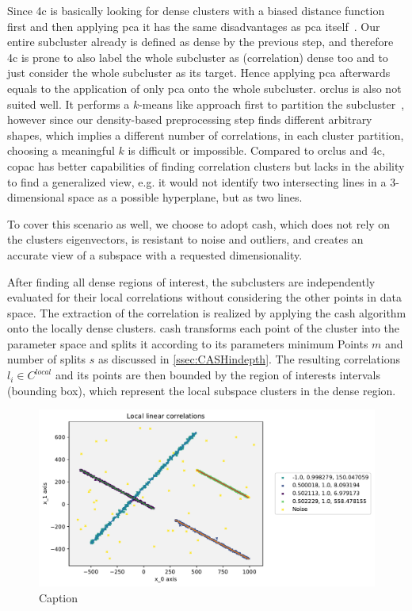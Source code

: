 Since \gls{4c} is basically looking for dense clusters with a biased distance function first and then applying \gls{pca} it has the same disadvantages as \gls{pca} itself~\cite{4cbohm2004computing}. Our entire subcluster already is defined as dense by the previous step, and therefore \gls{4c} is prone to also label the whole subcluster as (correlation) dense too and to just consider the whole subcluster as its target. Hence applying \gls{pca} afterwards equals to the application of only \gls{pca} onto the whole subcluster. 
\gls{orclus} is also not suited well. It performs a $k$-means like approach first to partition the subcluster~\cite{orclusaggarwal2000finding}, however since our density-based preprocessing step finds different arbitrary shapes, which implies a different number of correlations, in each cluster partition, choosing a meaningful $k$ is difficult or impossible. 
Compared to \gls{orclus} and \gls{4c}, \gls{copac} has better capabilities of finding correlation clusters but lacks in the ability to find a generalized view, e.g. it would not identify two intersecting lines in a 3-dimensional space as a possible hyperplane, but as two lines. 

To cover this scenario as well, we choose to adopt \gls{cash}, which does not rely on the clusters eigenvectors, is resistant to noise and outliers, and creates an accurate view of a subspace with a requested dimensionality.

After finding all dense regions of interest, the subclusters are independently evaluated for their local correlations without considering the other points in data space. The extraction of the correlation is realized by applying the \gls{cash} algorithm onto the locally dense clusters. \gls{cash} transforms each point of the cluster into the parameter space and splits it according to its parameters minimum Points $m$ and number of splits $s$ as discussed in \autoref{ssec:CASHindepth}. The resulting correlations $l_i \in C^{local}$ and its points are then bounded by the region of interests intervals (bounding box), which represent the local subspace clusters in the dense region.

\begin{figure}
    \centering
    \includegraphics[width=.6\textwidth]{figures_method/LocalLinearCorrelationsWithCorrs.pdf}
    \caption{Caption}
    \label{fig:my_label}
\end{figure}

